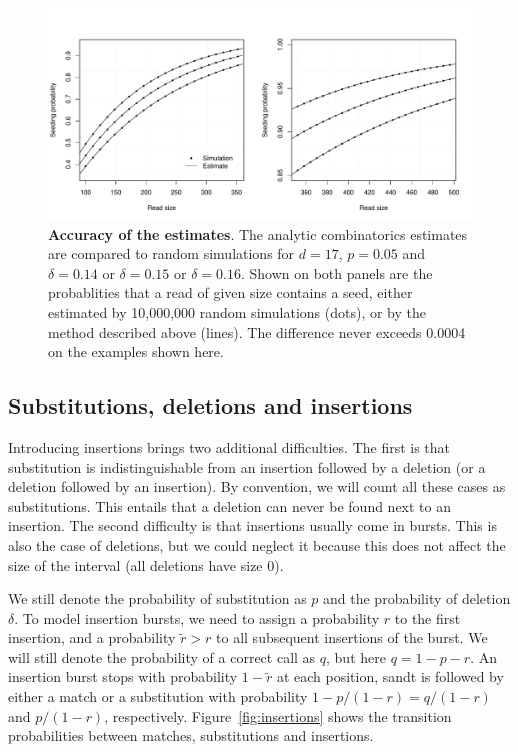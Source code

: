 \documentclass{article}
\begin{document}
\begin{figure}[h]
\centering
\includegraphics[scale=0.445]{simulpdel.pdf}
\caption{\textbf{Accuracy of the estimates}. The analytic combinatorics
estimates are compared to random simulations for $d=17$, $p=0.05$ and
$\delta=0.14$ or $\delta=0.15$ or $\delta=0.16$. Shown on both panels are
the probablities that a read of given size contains a seed, either
estimated by 10,000,000 random simulations (dots), or by the method
described above (lines). The difference never exceeds 0.0004 on the
examples shown here.}
\label{fig:simulpdel}
\end{figure}





\subsection{Substitutions, deletions and insertions}
\label{subsec:sdi}

Introducing insertions brings two additional difficulties. The first is
that substitution is indistinguishable from an insertion followed by a
deletion (or a deletion followed by an insertion). By convention, we will
count all these cases as substitutions. This entails that a deletion can
never be found next to an insertion. The second difficulty is that
insertions usually come in bursts. This is also the case of deletions, but
we could neglect it because this does not affect the size of the interval
(all deletions have size $0$). 

We still denote the probability of substitution as $p$ and the probability
of deletion $\delta$. To model insertion bursts, we need to assign a
probability $r$ to the first insertion, and a probability $\tilde{r} > r$
to all subsequent insertions of the burst. We will still denote the
probability of a correct call as $q$, but here $q = 1-p-r$.  An insertion
burst stops with probability $1-\tilde{r}$ at each position, sandt is
followed by either a match or a substitution with probability $1-p/(1-r) =
q/(1-r)$ and $p/(1-r)$, respectively. Figure~\ref{fig:insertions} shows
the transition probabilities between matches, substitutions and
insertions.
\end{document}

